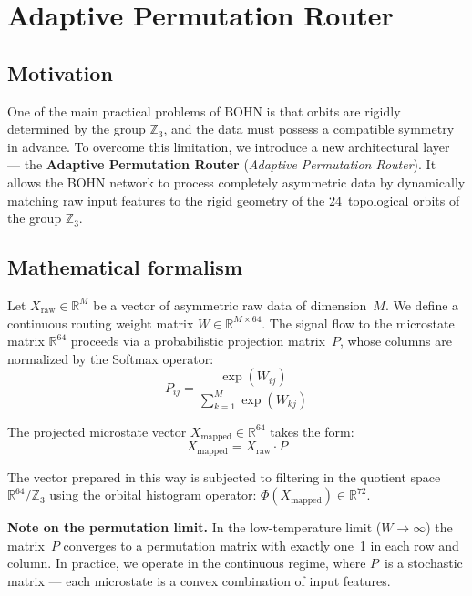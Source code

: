 \documentclass[11pt,a4paper]{report}
\begin{document}
\section{Adaptive Permutation Router}\label{sec:router}

\subsection{Motivation}

One of the main practical problems of BOHN is that orbits are rigidly determined by the group $\mathbb{Z}_3$, and the data must possess a compatible symmetry in advance. To overcome this limitation, we introduce a new architectural layer --- the \textbf{Adaptive Permutation Router} (\emph{Adaptive Permutation Router}). It allows the BOHN network to process completely asymmetric data by dynamically matching raw input features to the rigid geometry of the 24~topological orbits of the group $\mathbb{Z}_3$.

\subsection{Mathematical formalism}

Let $X_{\text{raw}} \in \mathbb{R}^M$ be a vector of asymmetric raw data of dimension~$M$. We define a continuous routing weight matrix $W \in \mathbb{R}^{M \times 64}$. The signal flow to the microstate matrix $\mathbb{R}^{64}$ proceeds via a probabilistic projection matrix~$P$, whose columns are normalized by the Softmax operator:
\begin{equation}
    P_{ij} = \frac{\exp(W_{ij})}{\sum_{k=1}^M \exp(W_{kj})}
\end{equation}

The projected microstate vector $X_{\text{mapped}} \in \mathbb{R}^{64}$ takes the form:
\begin{equation}
    X_{\text{mapped}} = X_{\text{raw}} \cdot P
\end{equation}

The vector prepared in this way is subjected to filtering in the quotient space $\mathbb{R}^{64}/\mathbb{Z}_3$ using the orbital histogram operator: $\Phi(X_{\text{mapped}}) \in \mathbb{R}^{72}$.

\textbf{Note on the permutation limit.} In the low-temperature limit ($W \to \infty$) the matrix~$P$ converges to a permutation matrix with exactly one~1 in each row and column. In practice, we operate in the continuous regime, where $P$~is a stochastic matrix --- each microstate is a convex combination of input features.
\end{document}
